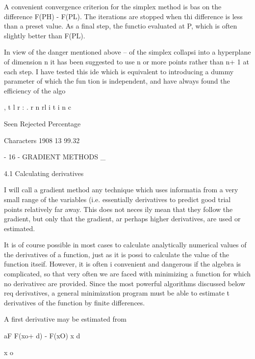      A convenient convergence criterion for the simplex method is bas
on the difference F(PH) - F(PL).  The iterations are stopped when thi
difference is less than a preset value.  As a final step, the functio
evaluated at P, which is often slightly better than F(PL).
 
     In view of the danger mentioned above -- of the simplex collapsi
into a hyperplane of dimension n       it has been suggested to use n
or more points rather than n+ 1 at each step.  I have tested this ide
which is equivalent to introducing a dummy parameter of which the fun
tion is independent, and have always found the efficiency of the algo
 
  ,           t l r : .  r  n rl i t i  n c 
 
                 Seen Rejected  Percentage
 
Characters       1908       13   99.32
 
                                 - 16 -
GRADIENT METHODS
_
 
4.1  Calculating derivatives
 
     I will call a gradient method any technique which uses informatia
from a very small range of the variables (i.e. essentially derivatives
to predict good trial points relatively far away.  This does not neces
ily mean that they follow the gradient, but only that the gradient, ar
perhaps higher derivatives, are used or estimated.
 
     It is of course possible in most cases to calculate analytically
numerical values of the derivatives of a function, just as it is possi
to calculate the value of the function itseif.  However, it is often i
convenient and dangerous if the algebra is complicated, so that very
often we are faced with minimizing a function for which no derivativec
are provided.  Since the most powerful algorithms discussed below req
derivatives, a general minimization program must be able to estimate t
derivatives of the function by finite differences.
 
     A first derivative may be estimated from
 
 
                      aF      F(xo+ d) - F(xO)
                        x              d
 
                       x o
 
 
 
 
 
 
 
 
 
 
 
